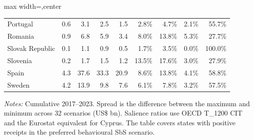 \begin{table}[H]
\begin{adjustbox}{max width=\textwidth,center}
\begin{tabular}{@{}l rrr r rrrr@{}}
Portugal & 0.6 & 3.1 & 2.5 & 1.5 & 2.8\% & 4.7\% & 2.1\% & 55.7\% \\
Romania & 0.9 & 6.8 & 5.9 & 3.4 & 8.0\% & 13.8\% & 5.3\% & 27.7\% \\
Slovak Republic & 0.1 & 1.1 & 0.9 & 0.5 & 1.7\% & 3.5\% & 0.0\% & 100.0\% \\
Slovenia & 0.2 & 1.7 & 1.5 & 1.2 & 13.5\% & 17.6\% & 3.0\% & 27.9\% \\
Spain & 4.3 & 37.6 & 33.3 & 20.9 & 8.6\% & 13.8\% & 4.1\% & 58.8\% \\
Sweden & 4.2 & 13.9 & 9.8 & 7.6 & 6.1\% & 7.8\% & 3.2\% & 57.5\% \\
\bottomrule
\end{tabular}
\end{adjustbox}

\vspace{0.35em}
\noindent\begin{minipage}{\textwidth}
\footnotesize\raggedright\textit{Notes:} Cumulative 2017–2023. Spread is the difference between the maximum and minimum across 32 scenarios (US\$ bn). Salience ratios use OECD T\_1200 CIT and the Eurostat equivalent for Cyprus. The table covers states with positive receipts in the preferred behavioural SbS scenario.
\end{minipage}
\end{table}
